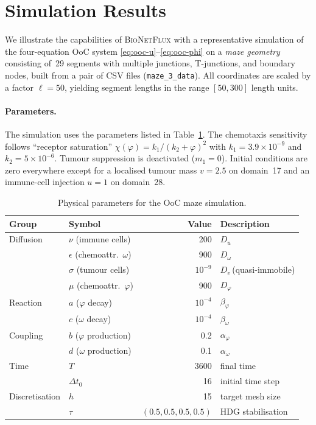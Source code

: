 \documentclass[11pt,a4paper]{article}
\newcommand{\code}[1]{\texttt{#1}}
\newcommand{\bionetflux}{\textsc{BioNetFlux}}
\begin{document}
\section{Simulation Results}\label{sec:results}

We illustrate the capabilities of \bionetflux{} with a
representative simulation of the four-equation OoC system
\eqref{eq:ooc-u}--\eqref{eq:ooc-phi}
on a \emph{maze geometry} consisting of~29 segments with multiple
junctions, T-junctions, and boundary nodes, built from a pair of
CSV files (\code{maze\_3\_data}).  All coordinates are scaled by
a factor $\ell=50$, yielding segment lengths in the range
$[50,300]$ length units.

\paragraph{Parameters.}
The simulation uses the parameters listed in
Table~\ref{tab:params}.  The chemotaxis sensitivity follows
``receptor saturation''
$\chi(\varphi)={k_1}/{(k_2+\varphi)^2}$
with $k_1=3.9\times 10^{-9}$ and $k_2=5\times 10^{-6}$.
Tumour suppression is deactivated ($m_1=0$).
Initial conditions are zero everywhere except for a localised
tumour mass $v=2.5$ on domain~17 and an immune-cell injection
$u=1$ on domain~28.

\begin{table}[H]
  \centering
  \caption{Physical parameters for the OoC maze simulation.}
  \label{tab:params}
  \begin{tabular}{@{}llrl@{}}
    \toprule
    Group & Symbol & Value & Description \\
    \midrule
    Diffusion
      & $\nu$ (immune cells)       & 200    & $D_u$ \\
      & $\epsilon$ (chemoattr.~$\omega$) & 900 & $D_\omega$ \\
      & $\sigma$ (tumour cells)    & $10^{-9}$ & $D_v$\,(quasi-immobile) \\
      & $\mu$ (chemoattr.~$\varphi$) & 900 & $D_\varphi$ \\[3pt]
    Reaction
      & $a$ ($\varphi$ decay)      & $10^{-4}$ & $\beta_\varphi$ \\
      & $c$ ($\omega$ decay)       & $10^{-4}$ & $\beta_\omega$ \\[3pt]
    Coupling
      & $b$ ($\varphi$ production) & 0.2   & $\alpha_\varphi$ \\
      & $d$ ($\omega$ production)  & 0.1   & $\alpha_\omega$ \\[3pt]
    Time
      & $T$                        & 3600  & final time \\
      & $\Delta t_0$               & 16    & initial time step \\[3pt]
    Discretisation
      & $h$                        & 15    & target mesh size \\
      & $\tau$                     & $(0.5,0.5,0.5,0.5)$ & HDG stabilisation \\
    \bottomrule
  \end{tabular}
\end{table}
\end{document}
